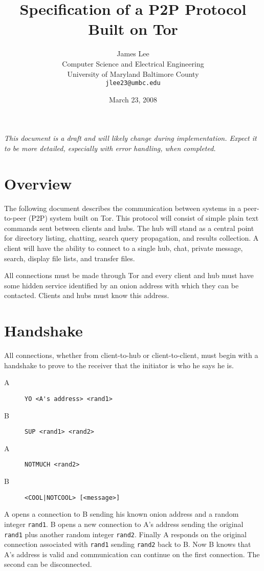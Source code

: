 \documentclass{article}
\title{Specification of a P2P Protocol Built on Tor}
\author{James Lee\\
	\small Computer Science and Electrical Engineering\\
	\small University of Maryland Baltimore County\\
	\small\tt jlee23@umbc.edu}
\date{March 23, 2008} %
\begin{document}
\maketitle

\textit{This document is a draft and will likely change during implementation.  Expect it to be more detailed, especially with error handling, when completed.}

\section{Overview}
The following document describes the communication between systems in a peer-to-peer (P2P) system built on Tor.  This protocol will consist of simple plain text commands sent between clients and hubs.  The hub will stand as a central point for directory listing, chatting, search query propagation, and results collection.  A client will have the ability to connect to a single hub, chat, private message, search, display file lists, and transfer files.

All connections must be made through Tor and every client and hub must have some hidden service identified by an onion address with which they can be contacted.  Clients and hubs must know this address.

\section{Handshake}
All connections, whether from client-to-hub or client-to-client, must begin with a handshake to prove to the receiver that the initiator is who he says he is.

\begin{description}
\item[A] \verb+YO <A's address> <rand1>+
\item[B] \verb+SUP <rand1> <rand2>+
\item[A] \verb+NOTMUCH <rand2>+
\item[B] \verb+<COOL|NOTCOOL> [<message>]+
\end{description}

A opens a connection to B sending his known onion address and a random integer \verb+rand1+.  B opens a new connection to A's address sending the original \verb+rand1+ plus another random integer \verb+rand2+.  Finally A responds on the original connection associated with \verb+rand1+ sending \verb+rand2+ back to B.  Now B knows that A's address is valid and communication can continue on the first connection.  The second can be disconnected.
\end{document}
